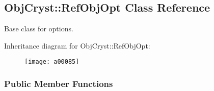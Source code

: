 \subsection{Obj\-Cryst\-:\-:Ref\-Obj\-Opt Class Reference}
\label{a00085}


Base class for options.  


Inheritance diagram for Obj\-Cryst\-:\-:Ref\-Obj\-Opt\-:\begin{figure}[H]
\begin{center}
\leavevmode
\texttt{[image: a00085]}
\end{center}
\end{figure}
\subsubsection*{Public Member Functions}
